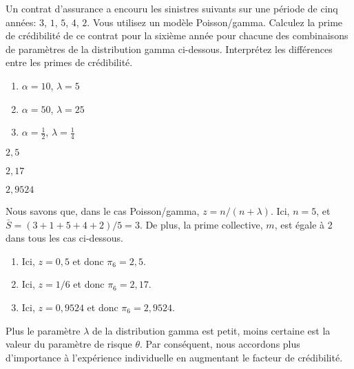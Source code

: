 \begin{exercice}
  Un contrat d'assurance a encouru les sinistres suivants sur une
  période de cinq années: $3$, $1$, $5$, $4$, $2$. Vous utilisez un
  modèle Poisson/gamma. Calculez la prime de crédibilité de ce contrat
  pour la sixième année pour chacune des combinaisons de paramètres de
  la distribution gamma ci-dessous. Interprétez les différences entre
  les primes de crédibilité.
  \begin{enumerate}
  \item $\alpha = 10$, $\lambda = 5$
  \item $\alpha = 50$, $\lambda = 25$
  \item $\alpha = \frac{1}{2}$, $\lambda = \frac{1}{4}$
  \end{enumerate}
  \begin{rep}
    \begin{inparaenum}
    \item $2,5$
    \item $2,17$
    \item $2,9524$
    \end{inparaenum}
  \end{rep}
  \begin{sol}
    Nous savons que, dans le cas Poisson/gamma, $z = n/(n + \lambda)$.
    Ici, $n = 5$, et $\bar{S} = (3 + 1 + 5 + 4 + 2)/5 = 3$. De plus,
    la prime collective, $m$, est égale à 2 dans tous les cas
    ci-dessous.
    \begin{enumerate}
    \item Ici, $z = 0,5$ et donc $\pi_6 = 2,5$.
    \item Ici, $z = 1/6$ et donc $\pi_6 = 2,17$.
    \item Ici, $z = 0,9524$ et donc $\pi_6 = 2,9524$.
    \end{enumerate}
    Plus le paramètre $\lambda$ de la distribution gamma est petit,
    moins certaine est la valeur du paramètre de risque $\theta$. Par
    conséquent, nous accordons plus d'importance à l'expérience
    individuelle en augmentant le facteur de crédibilité.
  \end{sol}
\end{exercice}

